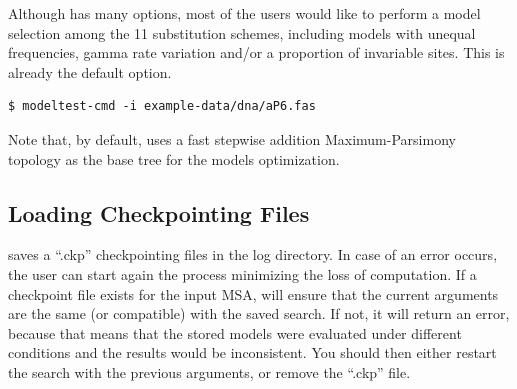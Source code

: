 \documentclass[10pt,twoside,a4paper]{article}
\begin{document}
Although {\modeltest} has many options, most of the users would like to perform a model selection among the 11 substitution schemes,
including models with unequal frequencies, gamma rate variation and/or a proportion of invariable sites.
This is already the default option.

\begin{verbatim}
$ modeltest-cmd -i example-data/dna/aP6.fas
\end{verbatim}

Note that, by default, {\modeltest} uses a fast stepwise addition Maximum-Parsimony topology as the base tree for the models optimization.

\subsection{Loading Checkpointing Files}
\label{sec:ckp}

\modeltest saves a ``.ckp'' checkpointing files in the log directory. In case of an error occurs,
the user can start again the process minimizing the loss of computation.
If a checkpoint file exists for the input MSA, \modeltest will ensure that the current arguments
are the same (or compatible) with the saved search.
If not, it will return an error, because that means that the stored models were evaluated under
different conditions and the results would be inconsistent.
You should then either restart the search with the previous arguments,
or remove the ``.ckp'' file.








%
%
%
%
%

\end{document}
